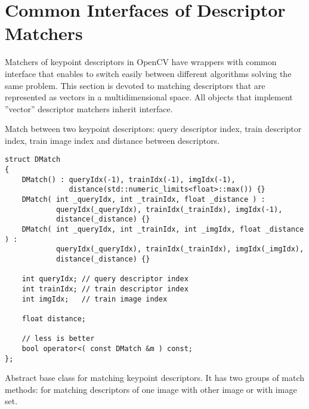 \section{Common Interfaces of Descriptor Matchers}
Matchers of keypoint descriptors in OpenCV have wrappers with common interface that enables to switch easily 
between different algorithms solving the same problem. This section is devoted to matching descriptors 
that are represented as vectors in a multidimensional space. All objects that implement ''vector'' 
descriptor matchers inherit  interface.

Match between two keypoint descriptors: query descriptor index, 
train descriptor index, train image index and distance between descriptors.

\begin{lstlisting}
struct DMatch
{
    DMatch() : queryIdx(-1), trainIdx(-1), imgIdx(-1), 
               distance(std::numeric_limits<float>::max()) {}
    DMatch( int _queryIdx, int _trainIdx, float _distance ) :
            queryIdx(_queryIdx), trainIdx(_trainIdx), imgIdx(-1), 
            distance(_distance) {}
    DMatch( int _queryIdx, int _trainIdx, int _imgIdx, float _distance ) :
            queryIdx(_queryIdx), trainIdx(_trainIdx), imgIdx(_imgIdx), 
            distance(_distance) {}

    int queryIdx; // query descriptor index
    int trainIdx; // train descriptor index
    int imgIdx;   // train image index

    float distance;

    // less is better
    bool operator<( const DMatch &m ) const;
};
\end{lstlisting}

Abstract base class for matching keypoint descriptors. It has two groups 
of match methods: for matching descriptors of one image with other image or
with image set.

